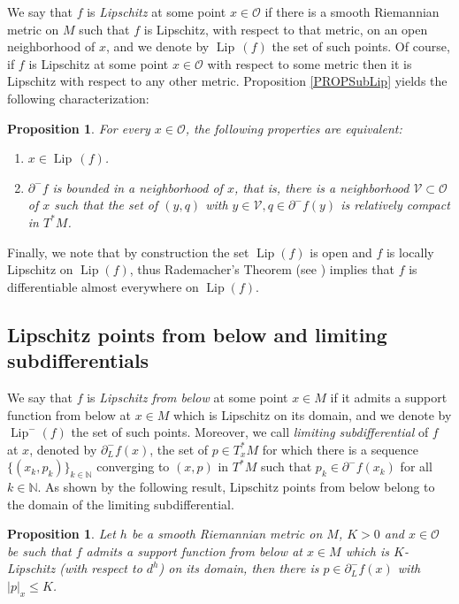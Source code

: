 \documentclass[JEP,XML,SOM,Unicode,NoFloatCountersInSection,published]{cedram}
\newenvironment{enumeratei}
{\bgroup\def\theenumi{\roman{enumi}}\def\theenumii{\arabic{enumii}}\begin{enumerate}}
{\end{enumerate}\egroup}
\DeclareMathOperator{\Lip}{Lip}
\newcommand\N{\mathbb N}
\newtheorem{proposition}[theorem]{Proposition}
\theoremstyle{definition}
\begin{document}
We say that $f$ is {\it Lipschitz} at some point $x\in \mathcal{O}$ if there is a smooth Riemannian metric on $M$ such that $f$ is Lipschitz, with respect to that metric, on an open neighborhood of $x$, and we denote by $\Lip\,(f)$ the set of such points. Of course, if $f$ is Lipschitz at some point $x\in \mathcal{O}$ with respect to some metric then it is Lipschitz with respect to any other metric. Proposition \ref{PROPSubLip} yields the following characterization:

\begin{proposition}\label{PROPSubLipEQ}
For every $x\in \mathcal{O}$, the following properties are equivalent:
\begin{enumeratei}
\item
$x \in \Lip\,(f)$.
\item
$\partial^-f$ is bounded in a neighborhood of $x$, that is, there is a neighborhood $\mathcal{V}\subset \mathcal{O}$ of $x$ such that the set of $(y,q)$ with $y\in \mathcal{V}, q\in \partial^-f(y)$ is relatively compact in $T^*M$.
\end{enumeratei}
\end{proposition}

Finally, we note that by construction the set $\Lip(f)$ is open and $f$ is locally Lipschitz on $\Lip(f)$, thus Rademacher's Theorem (see \eg \cite{eg15,federer69}) implies that $f$ is differentiable almost everywhere on $\Lip(f)$.

\subsection{Lipschitz points from below and limiting subdifferentials}

We say that $f$ is {\it Lipschitz from below} at some point $x\in M$ if it admits a support function from below at $x\in M$ which is Lipschitz on its domain, and we denote by $\Lip^-(f)$ the set of such points. Moreover, we call {\it limiting subdifferential} of $f$ at $x$, denoted by $\partial^-_Lf(x)$, the set of $p\in T_x^*M$ for which there is a sequence $\{(x_k,p_k)\}_{k\in \N}$ converging to $(x,p)$ in $T^*M$ such that $p_k\in \partial^-f(x_k)$ for all $k\in \N$. As shown by the following result, Lipschitz points from below belong to the domain of the limiting subdifferential.

\begin{proposition}\label{PROPLip-Lim}
Let $h$ be a smooth Riemannian metric on $M$, $K>0$ and $x\in \mathcal{O}$ be such that $f$ admits a support function from below at $x\in M$ which is $K$-Lipschitz (with respect to $d^h$) on its domain, then there is $p\in \partial^-_Lf(x)$ with $|p|_x\leq K$.
\end{proposition}
\end{document}
